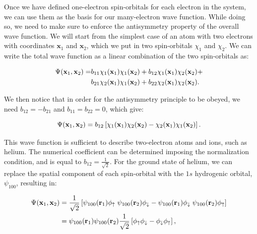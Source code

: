 \documentclass[
  9pt,
]{extbook}
\theoremstyle{definition}
\theoremstyle{definition}
\theoremstyle{definition}
\theoremstyle{remark}
\begin{document}
Once we have defined one-electron spin-orbitals for each electron in the system, we can use them as the basis for our many-electron wave function. While doing so, we need to make sure to enforce the antisymmetry property of the overall wave function. We will start from the simplest case of an atom with two electrons with coordinates \(\mathbf{x}_1\) and \(\mathbf{x}_2\), which we put in two spin-orbitals \(\chi_1\) and \(\chi_2\). We can write the total wave function as a linear combination of the two spin-orbitals as:

\begin{equation}
\begin{aligned}
\Psi({\bf x}_1, {\bf x}_2) =& b_{11} \chi_1({\bf x}_1) \chi_1({\bf x}_2) + b_{12} \chi_1({\bf x}_1) \chi_2({\bf x}_2) + \\
& b_{21} \chi_2({\bf x}_1) \chi_1({\bf x}_2) + b_{22} \chi_2({\bf x}_1) \chi_2({\bf x}_2).
\end{aligned}
\label{eq:atom4}
\end{equation}

We then notice that in order for the antisymmetry principle to be obeyed, we need \(b_{12} = -b_{21}\) and \(b_{11} = b_{22} = 0\), which give:

\begin{equation}
\Psi({\bf x}_1, {\bf x}_2) = b_{12} \left[ \chi_1({\bf x}_1) \chi_2({\bf x}_2) - \chi_2({\bf x}_1) \chi_1({\bf x}_2)\right].
\label{eq:atom5}
\end{equation}

This wave function is sufficient to describe two-electron atoms and ions, such as helium. The numerical coefficient can be determined imposing the normalization condition, and is equal to \(b_{12} = \frac{1}{\sqrt{2}}\). For the ground state of helium, we can replace the spatial component of each spin-orbital with the \(1s\) hydrogenic orbital, \(\psi_{100}\), resulting in:

\begin{equation}
\begin{aligned}
\Psi({\bf x}_1, {\bf x}_2) &= \frac{1}{\sqrt{2}} \left[ \psi_{100}({\bf r}_1)\phi_{\uparrow} \; \psi_{100}({\bf r}_2)\phi_{\downarrow} - \psi_{100}({\bf r}_1)\phi_{\downarrow} \; \psi_{100}({\bf r}_2)\phi_{\uparrow} \right] \\
&= \psi_{100}({\bf r}_1)\psi_{100}({\bf r}_2) \frac{1}{\sqrt{2}} \left[ \phi_{\uparrow}\phi_{\downarrow} - \phi_{\downarrow}\phi_{\uparrow} \right],
\end{aligned}
\label{eq:atom6}
\end{equation}
\end{document}
